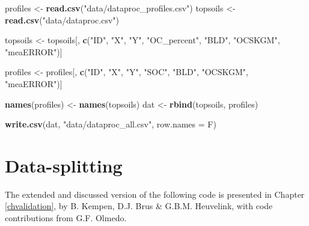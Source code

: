 \documentclass[10pt,b5paper,]{book}
\newenvironment{Shaded}{\begin{snugshade}}{\end{snugshade}}
\newcommand{\DataTypeTok}[1]{\textcolor[rgb]{0.13,0.29,0.53}{#1}}
\newcommand{\KeywordTok}[1]{\textcolor[rgb]{0.13,0.29,0.53}{\textbf{#1}}}
\newcommand{\NormalTok}[1]{#1}
\newcommand{\StringTok}[1]{\textcolor[rgb]{0.31,0.60,0.02}{#1}}
\theoremstyle{definition}
\theoremstyle{definition}
\theoremstyle{definition}
\theoremstyle{remark}
\begin{document}
\begin{Shaded}
\begin{Highlighting}[]
\NormalTok{profiles <-}\StringTok{ }\KeywordTok{read.csv}\NormalTok{(}\StringTok{"data/dataproc_profiles.csv"}\NormalTok{)}
\NormalTok{topsoils <-}\StringTok{ }\KeywordTok{read.csv}\NormalTok{(}\StringTok{"data/dataproc.csv"}\NormalTok{)}

\NormalTok{topsoils <-}\StringTok{ }\NormalTok{topsoils[, }\KeywordTok{c}\NormalTok{(}\StringTok{"ID"}\NormalTok{, }\StringTok{"X"}\NormalTok{, }\StringTok{"Y"}\NormalTok{, }\StringTok{"OC_percent"}\NormalTok{, }\StringTok{"BLD"}\NormalTok{,}
                         \StringTok{"OCSKGM"}\NormalTok{, }\StringTok{"meaERROR"}\NormalTok{)]}

\NormalTok{profiles <-}\StringTok{ }\NormalTok{profiles[, }\KeywordTok{c}\NormalTok{(}\StringTok{"ID"}\NormalTok{, }\StringTok{"X"}\NormalTok{, }\StringTok{"Y"}\NormalTok{, }\StringTok{"SOC"}\NormalTok{, }\StringTok{"BLD"}\NormalTok{,}
                         \StringTok{"OCSKGM"}\NormalTok{, }\StringTok{"meaERROR"}\NormalTok{)]}

\KeywordTok{names}\NormalTok{(profiles) <-}\StringTok{ }\KeywordTok{names}\NormalTok{(topsoils)}
\NormalTok{dat <-}\StringTok{ }\KeywordTok{rbind}\NormalTok{(topsoils, profiles)}

\KeywordTok{write.csv}\NormalTok{(dat, }\StringTok{"data/dataproc_all.csv"}\NormalTok{, }\DataTypeTok{row.names =}\NormalTok{ F)}
\end{Highlighting}
\end{Shaded}

\clearpage

\hypertarget{cd:data-splitting}{%
\section{Data-splitting}\label{cd:data-splitting}}

The extended and discussed version of the following code is presented in
Chapter \ref{chvalidation}, by B. Kempen, D.J. Brus \& G.B.M. Heuvelink,
with code contributions from G.F. Olmedo.
\end{document}
